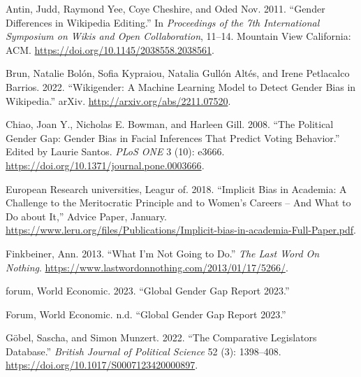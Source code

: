 \documentclass[
]{article}
\newlength{\cslhangindent}
\newlength{\cslentryspacingunit} %
\newenvironment{CSLReferences}[2] %
 {%
  \setlength{\parindent}{0pt}
  \ifodd #1
  \let\oldpar\par
  \def\par{\hangindent=\cslhangindent\oldpar}
  \fi
  \setlength{\parskip}{#2\cslentryspacingunit}
 }%
 {}
\begin{document}
\hypertarget{refs}{}
\begin{CSLReferences}{1}{0}
\leavevmode{}%
Antin, Judd, Raymond Yee, Coye Cheshire, and Oded Nov. 2011. {``Gender
Differences in {Wikipedia} Editing.''} In \emph{Proceedings of the 7th
{International} {Symposium} on {Wikis} and {Open} {Collaboration}},
11--14. Mountain View California: ACM.
\url{https://doi.org/10.1145/2038558.2038561}.

\leavevmode{}%
Brun, Natalie Bolón, Sofia Kypraiou, Natalia Gullón Altés, and Irene
Petlacalco Barrios. 2022. {``Wikigender: {A} {Machine} {Learning}
{Model} to {Detect} {Gender} {Bias} in {Wikipedia}.''} arXiv.
\url{http://arxiv.org/abs/2211.07520}.

\leavevmode{}%
Chiao, Joan Y., Nicholas E. Bowman, and Harleen Gill. 2008. {``The
{Political} {Gender} {Gap}: {Gender} {Bias} in {Facial} {Inferences}
That {Predict} {Voting} {Behavior}.''} Edited by Laurie Santos.
\emph{PLoS ONE} 3 (10): e3666.
\url{https://doi.org/10.1371/journal.pone.0003666}.

\leavevmode{}%
European Research universities, Leagur of. 2018. {``Implicit Bias in
Academia: {A} Challenge to the Meritocratic Principle and to Women's
Careers -- {And} What to Do about It,''} Advice {Paper}, January.
\url{https://www.leru.org/files/Publications/Implicit-bias-in-academia-Full-Paper.pdf}.

\leavevmode{}%
Finkbeiner, Ann. 2013. {``What {I}'m {Not} {Going} to {Do}.''} \emph{The
Last Word On Nothing}.
\url{https://www.lastwordonnothing.com/2013/01/17/5266/}.

\leavevmode{}%
forum, World Economic. 2023. {``Global {Gender} {Gap} {Report} 2023.''}

\leavevmode{}%
Forum, World Economic. n.d. {``Global {Gender} {Gap} {Report} 2023.''}

\leavevmode{}%
Göbel, Sascha, and Simon Munzert. 2022. {``The {Comparative}
{Legislators} {Database}.''} \emph{British Journal of Political Science}
52 (3): 1398--408. \url{https://doi.org/10.1017/S0007123420000897}.


\end{CSLReferences}
\end{document}
